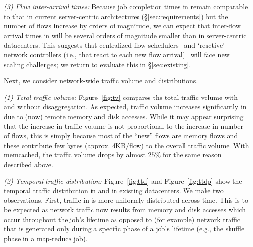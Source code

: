 \noindent \emph{(3) Flow inter-arrival times: } Because job completion times in \dis remain comparable to that in current server-centric architectures (\S\ref{sec:requirements}) but the number of flows increase by orders of magnitude, we can expect that inter-flow arrival times in \dis will be several orders of magnitude smaller than in server-centric datacenters. 
This suggests that centralized flow schedulers~\cite{fastpass} and `reactive' network controllers (i.e., that react to each new flow arrival)~\cite{nox} will face new scaling challenges; we return to evaluate this in \S\ref{sec:existing}.

\label{sssec:fctv}
Next, we consider network-wide traffic volume and distributions.

\noindent \emph{(1) Total traffic volume:}
Figure~\ref{fig:tv} compares the total traffic volume with and without disaggregation. As expected, traffic volume increases significantly in \dis due to (now) remote memory and disk accesses.
While it may appear surprising that the increase in traffic volume is not proportional to the increase in number of flows, this is simply because most of the ``new'' flows are memory flows and these contribute few bytes (approx. 4KB/flow) to the overall traffic volume. 
With memcached, the traffic volume drops by almost $25\%$ for the same reason described above. 


\noindent \emph{(2) Temporal traffic distribution:}
Figure~\ref{fig:ttd} and Figure~\ref{fig:ttdp} show the temporal traffic distribution in \dis and in existing datacenters. We make two observations. 
First, traffic in \dis is more uniformly distributed across time. This is to be expected as network traffic now results from memory and disk accesses which occur throughout the job's lifetime  
as opposed to (for example) network traffic that is generated only during a specific 
phase of a job's lifetime (e.g., the shuffle phase in a map-reduce job).


